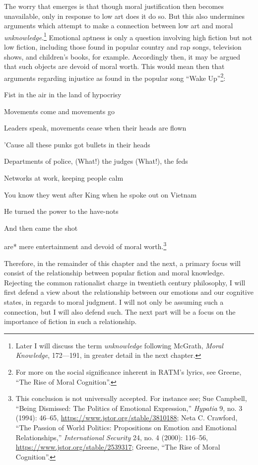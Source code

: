 \documentclass[phdthesis,12pt,final]{wuthesis}
\theoremstyle{definition}
\theoremstyle{definition}
\theoremstyle{definition}
\theoremstyle{definition}
\theoremstyle{remark}
\begin{document}
The worry that emerges is that though moral justification then becomes unavailable, only in response to low art does it do so. But this also undermines arguments which attempt to make a connection between low art and moral \emph{unknowledge}.\footnote{Later I will discuss the term \emph{unknowledge} following McGrath, \emph{Moral {Knowledge}}, 172---191, in greater detail in the next chapter.} Emotional aptness is only a question involving high fiction but not low fiction, including those found in popular country and rap songs, television shows, and children's books, for example. Accordingly then, it may be argued that such objects are devoid of moral worth. This would mean then that arguments regarding injustice as found in the popular song ``Wake Up''\footnote{For more on the social significance inherent in RATM's lyrics, see Greene, {``The Rise of Moral Cognition''}.}:

Fist in the air in the land of hypocrisy

Movements come and movements go

Leaders speak, movements cease when their heads are flown

'Cause all these punks got bullets in their heads

Departments of police, (What!) the judges (What!), the feds

Networks at work, keeping people calm

You know they went after King when he spoke out on Vietnam

He turned the power to the have-nots

And then came the shot

\noindent *are* mere entertainment and devoid of moral worth.\footnote{This conclusion is not universally accepted. For instance see; Sue Campbell, {``Being {Dismissed}: {The Politics} of {Emotional Expression},''} \emph{Hypatia} 9, no. 3 (1994): 46--65, \url{https://www.jstor.org/stable/3810188}; Neta C. Crawford, {``The Passion of World Politics: Propositions on Emotion and Emotional Relationships,''} \emph{International Security} 24, no. 4 (2000): 116--56, \url{https://www.jstor.org/stable/2539317}; Greene, {``The Rise of Moral Cognition''}.}

Therefore, in the remainder of this chapter and the next, a primary focus will consist of the relationship between popular fiction and moral knowledge. Rejecting the common rationalist charge in twentieth century philosophy, I will first defend a view about the relationship between our emotions and our cognitive states, in regards to moral judgment. I will not only be assuming such a connection, but I will also defend such. The next part will be a focus on the importance of fiction in such a relationship.
\end{document}
